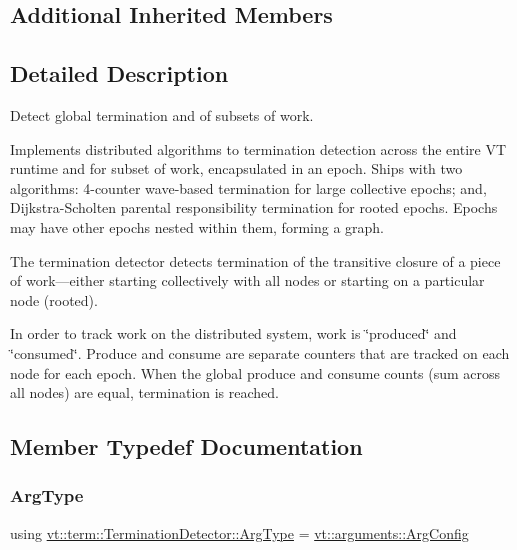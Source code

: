 \subsection*{Additional Inherited Members}


\subsection{Detailed Description}
Detect global termination and of subsets of work. 

Implements distributed algorithms to termination detection across the entire VT runtime and for subset of work, encapsulated in an epoch. Ships with two algorithms\+: 4-\/counter wave-\/based termination for large collective epochs; and, Dijkstra-\/\+Scholten parental responsibility termination for rooted epochs. Epochs may have other epochs nested within them, forming a graph.

The termination detector detects termination of the transitive closure of a piece of work---either starting collectively with all nodes or starting on a particular node (rooted).

In order to track work on the distributed system, work is \char`\"{}produced\char`\"{} and \char`\"{}consumed\char`\"{}. Produce and consume are separate counters that are tracked on each node for each epoch. When the global produce and consume counts (sum across all nodes) are equal, termination is reached. 

\subsection{Member Typedef Documentation}
\mbox{\label{structvt_1_1term_1_1_termination_detector_a6b172cf395acf512b3f9698651c4e10d}} 
\subsubsection{\texorpdfstring{Arg\+Type}{ArgType}}
{\footnotesize\ttfamily using \hyperlink{structvt_1_1term_1_1_termination_detector_a6b172cf395acf512b3f9698651c4e10d}{vt\+::term\+::\+Termination\+Detector\+::\+Arg\+Type} =  \hyperlink{structvt_1_1arguments_1_1_arg_config}{vt\+::arguments\+::\+Arg\+Config}}


